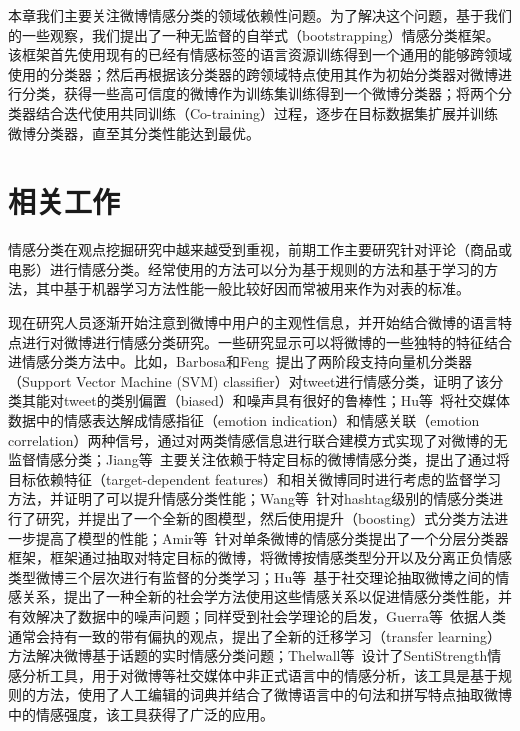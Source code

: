 本章我们主要关注微博情感分类的领域依赖性问题。为了解决这个问题，基于我们的一些观察，我们提出了一种无监督的自举式（bootstrapping）情感分类框架。该框架首先使用现有的已经有情感标签的语言资源训练得到一个通用的能够跨领域使用的分类器；然后再根据该分类器的跨领域特点使用其作为初始分类器对微博进行分类，获得一些高可信度的微博作为训练集训练得到一个微博分类器；将两个分类器结合迭代使用共同训练（Co-training）过程，逐步在目标数据集扩展并训练微博分类器，直至其分类性能达到最优。

\section{相关工作}
\label{ch4_relt}
情感分类在观点挖掘研究中越来越受到重视，前期工作主要研究针对评论（商品或电影）进行情感分类。经常使用的方法可以分为基于规则的方法和基于学习的方法，其中基于机器学习方法性能一般比较好因而常被用来作为对表的标准。

现在研究人员逐渐开始注意到微博中用户的主观性信息，并开始结合微博的语言特点进行对微博进行情感分类研究。一些研究显示可以将微博的一些独特的特征结合进情感分类方法中。比如，Barbosa和Feng~提出了两阶段支持向量机分类器（Support Vector Machine (SVM) classifier）对tweet进行情感分类，证明了该分类其能对tweet的类别偏置（biased）和噪声具有很好的鲁棒性；Hu等~将社交媒体数据中的情感表达解成情感指征（emotion indication）和情感关联（emotion correlation）两种信号，通过对两类情感信息进行联合建模方式实现了对微博的无监督情感分类；Jiang等~主要关注依赖于特定目标的微博情感分类，提出了通过将目标依赖特征（target-dependent features）和相关微博同时进行考虑的监督学习方法，并证明了可以提升情感分类性能；Wang等~针对hashtag级别的情感分类进行了研究，并提出了一个全新的图模型，然后使用提升（boosting）式分类方法进一步提高了模型的性能；Amir等~针对单条微博的情感分类提出了一个分层分类器框架，框架通过抽取对特定目标的微博，将微博按情感类型分开以及分离正负情感类型微博三个层次进行有监督的分类学习；Hu等~基于社交理论抽取微博之间的情感关系，提出了一种全新的社会学方法使用这些情感关系以促进情感分类性能，并有效解决了数据中的噪声问题；同样受到社会学理论的启发，Guerra等~依据人类通常会持有一致的带有偏执的观点，提出了全新的迁移学习（transfer learning）方法解决微博基于话题的实时情感分类问题；Thelwall等~设计了SentiStrength情感分析工具，用于对微博等社交媒体中非正式语言中的情感分析，该工具是基于规则的方法，使用了人工编辑的词典并结合了微博语言中的句法和拼写特点抽取微博中的情感强度，该工具获得了广泛的应用。

